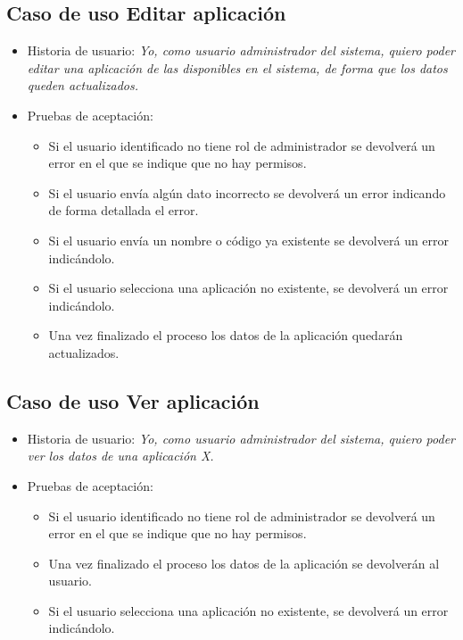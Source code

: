\documentclass[12pt,a4paperpaper,]{report}
\providecommand{\tightlist}{%
  \setlength{\itemsep}{0pt}\setlength{\parskip}{0pt}}
\begin{document}
\subsection{Caso de uso Editar
aplicación}\label{caso-de-uso-editar-aplicaciuxf3n-2}

\begin{itemize}
\tightlist
\item
  Historia de usuario: \emph{Yo, como usuario administrador del sistema,
  quiero poder editar una aplicación de las disponibles en el sistema,
  de forma que los datos queden actualizados.}
\item
  Pruebas de aceptación:

  \begin{itemize}
  \tightlist
  \item
    Si el usuario identificado no tiene rol de administrador se
    devolverá un error en el que se indique que no hay permisos.
  \item
    Si el usuario envía algún dato incorrecto se devolverá un error
    indicando de forma detallada el error.
  \item
    Si el usuario envía un nombre o código ya existente se devolverá un
    error indicándolo.
  \item
    Si el usuario selecciona una aplicación no existente, se devolverá
    un error indicándolo.
  \item
    Una vez finalizado el proceso los datos de la aplicación quedarán
    actualizados.
  \end{itemize}
\end{itemize}

\subsection{Caso de uso Ver
aplicación}\label{caso-de-uso-ver-aplicaciuxf3n}

\begin{itemize}
\tightlist
\item
  Historia de usuario: \emph{Yo, como usuario administrador del sistema,
  quiero poder ver los datos de una aplicación X.}
\item
  Pruebas de aceptación:

  \begin{itemize}
  \tightlist
  \item
    Si el usuario identificado no tiene rol de administrador se
    devolverá un error en el que se indique que no hay permisos.
  \item
    Una vez finalizado el proceso los datos de la aplicación se
    devolverán al usuario.
  \item
    Si el usuario selecciona una aplicación no existente, se devolverá
    un error indicándolo.
  \end{itemize}
\end{itemize}
\end{document}
